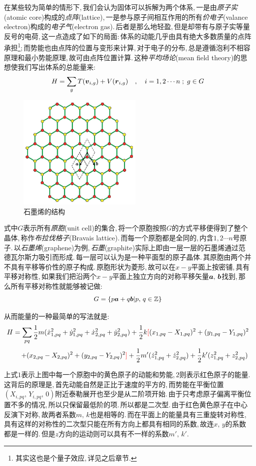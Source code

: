 在某些较为简单的情形下,\,我们会认为固体可以拆解为两个体系,\,一是由\emph{原子实}(atomic core)构成的\emph{点阵}(lattice),\,一是参与原子间相互作用的所有\emph{价电子}(valance electron)构成的\emph{电子气}(electron gas).\,后者是那么地轻盈,\,但是却带有与原子实等量反号的电荷,\,这一点造成了如下的局面:\,体系的动能几乎由具有绝大多数质量的点阵承担\footnote{其实这也是个量子效应,\,详见之后章节.};\,而势能也由点阵的位置与变形来计算,\,对于电子的分布,\,总是遵循泡利不相容原理和最小势能原理,\,故可由点阵位置计算.\,这种\emph{平均场论}(mean field theory)的思想使我们写出体系的总能量来:
\[H=\sum_g T(\boldsymbol{v}_{i,g})+V(\boldsymbol{r}_{i,g})\quad ,\quad i=1,2\cdots n\;;\;g\in G\]

\begin{figure}
\centering
\includegraphics[width=6cm]{image/5-3-4.png}
\caption{石墨烯的结构}\label{fig:graphene}
\end{figure}
式中$G$表示所有\emph{原胞}(unit cell)的集合,\,将一个原胞按照$G$的方式平移便得到了整个晶体,\,称作\emph{布拉伐格子}(Bravais lattice).\,而每一个原胞都是全同的,\,内含$1,2\cdots n$号原子.\,以\emph{石墨烯}(graphene)为例,\,\emph{石墨}(graphite)实际上即由一层一层的石墨烯通过范德瓦尔斯力吸引而形成.\,每一层可以认为是一种平面型的原子晶体.\,其原胞由两个并不具有平移等价性的原子构成.\,原胞形状为菱形,\,故可以在$x-y$平面上按密铺,\,具有平移对称性,\,如果我们把沿两个$x-y$平面上独立方向的对称平移矢量$\boldsymbol{a},\,\boldsymbol{b}$找到,\,那么所有平移对称性就能够被记做:
\[G=\{p\boldsymbol{a}+q\boldsymbol{b}|p,\,q\in  \mathbb{Z}\}\]

从而能量的一种最简单的写法就是:
\[H=\sum_{pq}  \frac{1}{2}m(\dot{x}_{1,pq}^2+\dot{y}_{1,pq}^2+\dot{x}_{2,pq}^2+\dot{y}_{2,pq}^2)+\frac{1}{2}k{\color{red}[}(x_{1,pq}-X_{1,pq})^2+(y_{1,pq}-Y_{1,pq})^2\]
\[\qquad +(x_{2,pq}-X_{2,pq})^2+(y_{2,pq}-Y_{2,pq})^2{\color{red}]}+\frac{1}{2}m'(\dot{z}_{1,pq}^2+\dot{z}_{2,pq}^2)+\frac{1}{2}k'(z_{1,pq}^2+z_{2,pq}^2)\]

上式$1$表示上图中每一个原胞中的黄色原子的动能和势能,\,$2$则表示红色原子的能量.\,这背后的原理是,\,首先动能自然是正比于速度的平方的,\,而势能在平衡位置$(X_{i,pq},\,Y_{i,pq},\,0)$附近泰勒展开也至少是从二阶项开始.\,由于只考虑原子偏离平衡位置不多的情况,\,所以只保留最低阶的项.\,所以都是二次型.\,由于红色黄色原子在中心反演下对称,\,故两者系数$m,\,k$也是相等的.\,而在平面上的能量具有三重旋转对称性,\,具有这样的对称性的二次型只能在所有方向上都具有相同的系数,\,故连$x,\,y$的系数都是一样的.\,但是$z$方向的运动则可以具有不一样的系数$m',\,k'$.


